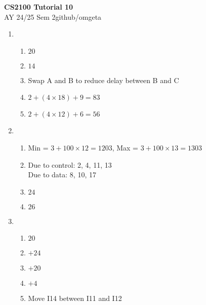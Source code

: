 \documentclass[12pt, a4paper]{article}
\newcommand{\mytitle}{CS2100 Tutorial 10}
\newcommand{\myauthor}{github/omgeta}
\newcommand{\mydate}{AY 24/25 Sem 2}
\begin{document}
\raggedright
\footnotesize
\begin{center}
{\normalsize{\textbf{\mytitle}}} \\
{\footnotesize{\mydate\hspace{2pt}\textemdash\hspace{2pt}\myauthor}}
\end{center}
\begin{enumerate}[Q\arabic*.]
  \item 
    \begin{enumerate}[(\alph*.)]
      \item $20$

      \item $14$

      \item Swap A and B to reduce delay between B and C 

      \item $2 + (4 \times 18) + 9 = 83$

      \item $2 + (4 \times 12) + 6 = 56$
    \end{enumerate}

  \item 
    \begin{enumerate}[(\alph*.)]
      \item Min = $3 + 100 \times 12 = 1203$, Max = $3 + 100 \times 13 = 1303$

      \item Due to control: 2, 4, 11, 13\\
        Due to data: 8, 10, 17

      \item $24$

      \item $26$
    \end{enumerate}

  \item 
    \begin{enumerate}[(\alph*.)]
      \item $20$

      \item $+24$

      \item $+20$

      \item $+4$

      \item Move I14 between I11 and I12
    \end{enumerate}
\end{enumerate}
\end{document}
